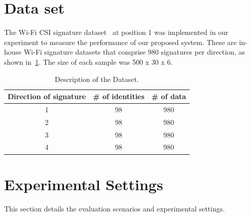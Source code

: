 \label{chp:Experiments}
\section{Data set}
\label{sec:Dataset}
The Wi-Fi CSI signature dataset~\cite{moon2017air} at position 1 was implemented in our experiment to measure the performance of our proposed system. These are in-house Wi-Fi signature datasets that comprise 980 signatures per direction, as shown in~\ref{tab_dataset}. The size of each sample was 500 x 30 x 6. 
\begin{table}
    \caption{Description of the Dataset.}
    \label{tab_dataset}
    \begin{tabular}{ccc}
    \hline
    Direction of signature & \# of identities & \# of data \\ 
    \hline
    1                      & 98               & 980        \\ 
    2                      & 98               & 980        \\ 
    3                      & 98               & 980        \\ 
    4                      & 98               & 980        \\ 
    \hline
    \end{tabular}
\end{table}

\section{Experimental Settings}
This section details the evaluation scenarios and experimental settings.

